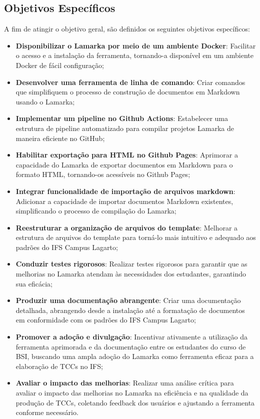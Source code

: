 \documentclass[
	12pt,				%
	oneside,			%
	a4paper,			%
	english,			%
	french,				%
	spanish,			%
	brazil				%
	]{abntex2}
\begin{document}
\hypertarget{objetivos-especuxedficos}{%
\subsection{Objetivos Específicos}\label{objetivos-especuxedficos}}

A fim de atingir o objetivo geral, são definidos os seguintes objetivos
específicos:

\begin{itemize}
\tightlist
\item
  \textbf{Disponibilizar o Lamarka por meio de um ambiente Docker}:
  Facilitar o acesso e a instalação da ferramenta, tornando-a disponível
  em um ambiente Docker de fácil configuração;
\item
  \textbf{Desenvolver uma ferramenta de linha de comando}: Criar
  comandos que simplifiquem o processo de construção de documentos em
  Markdown usando o Lamarka;
\item
  \textbf{Implementar um pipeline no Github Actions}: Estabelecer uma
  estrutura de pipeline automatizado para compilar projetos Lamarka de
  maneira eficiente no GitHub;
\item
  \textbf{Habilitar exportação para HTML no Github Pages}: Aprimorar a
  capacidade do Lamarka de exportar documentos em Markdown para o
  formato HTML, tornando-os acessíveis no Github Pages;
\item
  \textbf{Integrar funcionalidade de importação de arquivos markdown}:
  Adicionar a capacidade de importar documentos Markdown existentes,
  simplificando o processo de compilação do Lamarka;
\item
  \textbf{Reestruturar a organização de arquivos do template}: Melhorar
  a estrutura de arquivos do template para torná-lo mais intuitivo e
  adequado aos padrões do IFS Campus Lagarto;
\item
  \textbf{Conduzir testes rigorosos}: Realizar testes rigorosos para
  garantir que as melhorias no Lamarka atendam às necessidades dos
  estudantes, garantindo sua eficácia;
\item
  \textbf{Produzir uma documentação abrangente}: Criar uma documentação
  detalhada, abrangendo desde a instalação até a formatação de
  documentos em conformidade com os padrões do IFS Campus Lagarto;
\item
  \textbf{Promover a adoção e divulgação}: Incentivar ativamente a
  utilização da ferramenta aprimorada e da documentação entre os
  estudantes do curso de BSI, buscando uma ampla adoção do Lamarka como
  ferramenta eficaz para a elaboração de TCCs no IFS;
\item
  \textbf{Avaliar o impacto das melhorias}: Realizar uma análise crítica
  para avaliar o impacto das melhorias no Lamarka na eficiência e na
  qualidade da produção de TCCs, coletando feedback dos usuários e
  ajustando a ferramenta conforme necessário.
\end{itemize}
\end{document}
